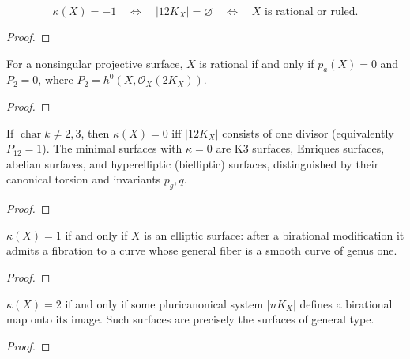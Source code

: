 \begin{theorem}[The case \(\kappa=-1\)]
\label{ha-v6-1}
\[
 \kappa(X)=-1\quad\Longleftrightarrow\quad |12K_X|=\varnothing
 \quad\Longleftrightarrow\quad X\text{ is rational or ruled}.
\]

\end{theorem}
\begin{proof}
\notready
\end{proof}

\begin{theorem}
\label{ha-v6-2}
For a nonsingular projective surface, \(X\) is rational if and only if
\(p_a(X)=0\) and \(P_2=0\), where
\(P_2=h^0(X,\mathcal O_X(2K_X))\).

\end{theorem}
\begin{proof}
\notready
\end{proof}

\begin{theorem}[The case \(\kappa=0\)]
\label{ha-v6-3}
If \(\operatorname{char}k\ne2,3\), then
\(\kappa(X)=0\) iff \(|12K_X|\) consists of one divisor (equivalently
\(P_{12}=1\)).  The minimal surfaces with \(\kappa=0\) are K3 surfaces,
Enriques surfaces, abelian surfaces, and hyperelliptic (bielliptic) surfaces,
distinguished by their canonical torsion and invariants \(p_g,q\).

\end{theorem}
\begin{proof}
\notready
\end{proof}

\begin{theorem}[The case \(\kappa=1\)]
\label{ha-v6-4}
\(\kappa(X)=1\) if and only if \(X\) is an elliptic surface: after a birational
modification it admits a fibration to a curve whose general fiber is a smooth
curve of genus one.

\end{theorem}
\begin{proof}
\notready
\end{proof}

\begin{theorem}[The case \(\kappa=2\)]
\label{ha-v6-5}
\(\kappa(X)=2\) if and only if some pluricanonical system \(|nK_X|\) defines a
birational map onto its image.  Such surfaces are precisely the surfaces of
general type.

\end{theorem}
\begin{proof}
\notready
\end{proof}
